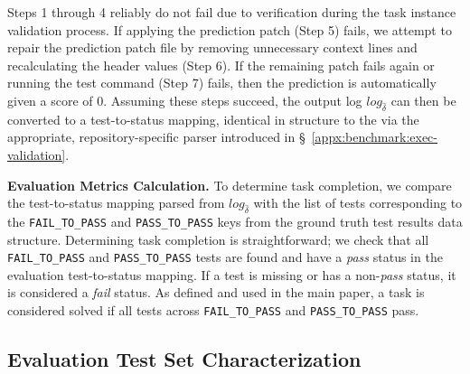 Steps 1 through 4 reliably do not fail due to verification during the task instance validation process. If applying the prediction patch (Step 5) fails, we attempt to repair the prediction patch file by removing unnecessary context lines and recalculating the header values (Step 6). If the remaining patch fails again or running the test command (Step 7) fails, then the prediction is automatically given a score of $0$. Assuming these steps succeed, the output log $log_{\hat{\delta}}$ can then be converted to a test-to-status mapping, identical in structure to the  via the appropriate, repository-specific parser introduced in \S~\ref{appx:benchmark:exec-validation}.

\textbf{Evaluation Metrics Calculation.}
To determine task completion, we compare the test-to-status mapping parsed from $log_{\hat{\delta}}$ with the list of tests corresponding to the \texttt{FAIL\_TO\_PASS} and \texttt{PASS\_TO\_PASS} keys from the ground truth test results data structure.
Determining task completion is straightforward; we check that all \texttt{FAIL\_TO\_PASS} and \texttt{PASS\_TO\_PASS} tests are found and have a \textit{pass} status in the evaluation test-to-status mapping.
If a test is missing or has a non-\textit{pass} status, it is considered a \textit{fail} status. As defined and used in the main paper, a task is considered solved if all tests across \texttt{FAIL\_TO\_PASS} and \texttt{PASS\_TO\_PASS} pass.

\subsection{Evaluation Test Set Characterization}
\label{appx:benchmark:repo-stats}



